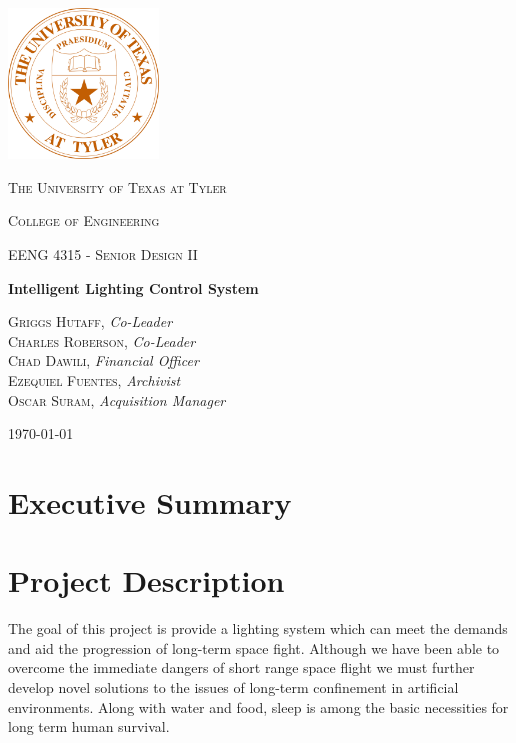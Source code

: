 \documentclass[12pt,a4paper]{report}
\begin{document}
\begin{titlepage}

	\centering
	\includegraphics[width=0.3\textwidth]{uttseal.png}\par\vspace{0.1cm}
	{\scshape\LARGE The University of Texas at Tyler\par}
	\vspace{0.1cm}
	{\scshape\LARGE College of Engineering\par}
	\vspace{1cm}
	{\scshape\Large EENG 4315 - Senior Design II\par}
	\vspace{1cm}
	{\huge\bfseries Intelligent Lighting Control System\par}
	\vspace{2cm}
	\textsc{Griggs Hutaff},  \textit{Co-Leader}\\
	\textsc{Charles Roberson},  \textit{Co-Leader}\\
	\textsc{Chad Dawili},  \textit{Financial Officer}\\
	\textsc{Ezequiel Fuentes},  \textit{Archivist}\\
	\textsc{Oscar Suram},  \textit{Acquisition Manager}
	\vfill

	{\large \today\par}
\end{titlepage}
\section*{Executive Summary}
\blindtext
\newpage
\tableofcontents
\listoffigures
\listoftables
\newpage
\section{Project Description}
The goal of this project is provide a lighting system which can meet the demands and aid the progression of long-term space fight. Although we have been able to overcome the immediate dangers of short range space flight we must further develop novel solutions to the issues of long-term confinement in artificial environments. Along with water and food, sleep is among the basic necessities for long term human survival. \\
\cite{nasapatent}
\end{document}
